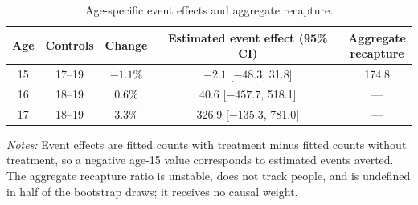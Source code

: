 \begin{table}[!htbp]
\centering
\caption{Age-specific event effects and aggregate recapture.}
\label{tab:delay_recapture}
\begingroup\footnotesize
\begin{tabular}{@{}ccccc@{}}
\toprule
Age & Controls & Change & Estimated event effect (95\% CI) &
\shortstack{Aggregate\\recapture} \\
\midrule
15 & 17--19 & $-1.1\%$ & $-2.1$ [$-48.3$, 31.8] & 174.8 \\
16 & 18--19 & $0.6\%$ & 40.6 [$-457.7$, 518.1] & --- \\
17 & 18--19 & $3.3\%$ & 326.9 [$-135.3$, 781.0] & --- \\
\bottomrule
\end{tabular}
\par\smallskip
\begin{minipage}{0.96\linewidth}\footnotesize
\emph{Notes:} Event effects are fitted counts with treatment minus fitted counts without
treatment, so a negative age-15 value corresponds to estimated events averted. The
aggregate recapture ratio is unstable, does not track people, and is undefined in half
of the bootstrap draws; it receives no causal weight.
\end{minipage}
\endgroup
\end{table}
